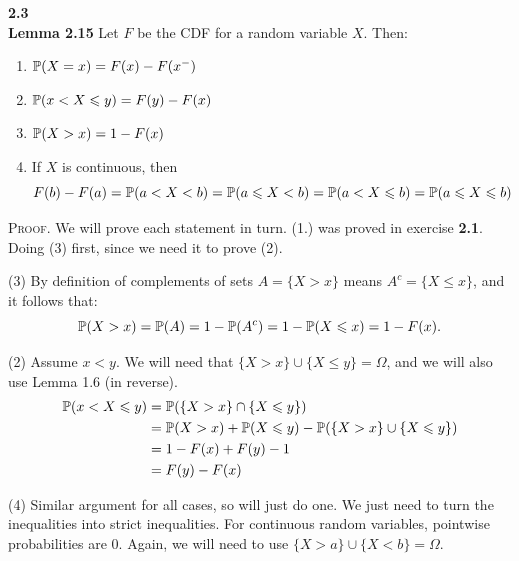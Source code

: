 \bigskip\noindent
\textbf{2.3}\\  %
\textbf{Lemma 2.15} Let $F$ be the CDF for a random variable $X$. Then:
\begin{enumerate}
    \item $\P(X = x) = F(x) - F(x^-)$
    \item $\P(x < X\leq y) = F(y) - F(x)$
    \item $\P(X > x) = 1 - F(x)$
    \item If $X$ is continuous, then
$$
F(b) - F(a) = \P(a < X < b) = \P(a \leq X < b) = \P(a < X\leq b) = \P(a\leq X\leq b)
$$
\end{enumerate}
\textsc{Proof}. We will prove each statement in turn. (1.) was proved in exercise \textbf{2.1}.
Doing (3) first, since we need it to prove (2).

\medskip\noindent(3) By definition of complements of sets $A = \{X > x\}$ means $A^c = \{X\leq x\}$,
and it follows that:
$$
\P(X > x) = \P(A) = 1 - \P(A^c) = 1 - \P(X\leq x) = 1 - F(x).
$$

\medskip\noindent(2) Assume $x < y$. We will need that $\{X > x\}\cup\{X\leq y\} = \Omega$,
and we will also use Lemma 1.6 (in reverse).
\begin{align*}
    \P(x < X\leq y) &= \P(\{X > x\}\cap\{X\leq y\}) \\
    &= \P(X > x) + \P(X\leq y) - \P(\{X > x\}\cup\{X\leq y\}) \\
    &= 1 - F(x) + F(y) - 1 \\
    &= F(y) - F(x)
\end{align*}

\medskip\noindent(4) Similar argument for all cases, so will just do one.
We just need to turn the inequalities into
strict inequalities. For continuous random variables, pointwise probabilities are 0.
Again, we will need to use $\{X > a\}\cup\{X < b\} = \Omega$.

